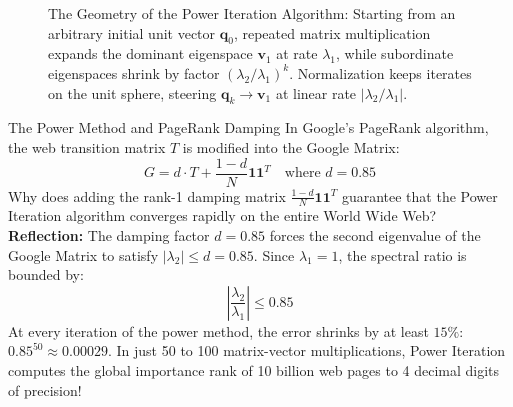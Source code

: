 \begin{figure}[htbp]
\begin{tikzpicture}
\end{tikzpicture}
\caption{The Geometry of the Power Iteration Algorithm: Starting from an arbitrary initial unit vector $\mathbf{q}_0$, repeated matrix multiplication expands the dominant eigenspace $\mathbf{v}_1$ at rate $\lambda_1$, while subordinate eigenspaces shrink by factor $(\lambda_2/\lambda_1)^k$. Normalization keeps iterates on the unit sphere, steering $\mathbf{q}_k \to \mathbf{v}_1$ at linear rate $|\lambda_2/\lambda_1|$.}
\label{fig:power_iteration_geometry}
\end{figure}

\begin{ponderbox}{The Power Method and PageRank Damping}
In Google's PageRank algorithm, the web transition matrix $T$ is modified into the Google Matrix:
\begin{equation*}
G = d \cdot T + \frac{1 - d}{N} \mathbf{1}\mathbf{1}^T \quad \text{where } d = 0.85
\end{equation*}
Why does adding the rank-1 damping matrix $\frac{1-d}{N}\mathbf{1}\mathbf{1}^T$ guarantee that the Power Iteration algorithm converges rapidly on the entire World Wide Web?
\tcblower
\textbf{Reflection:}
The damping factor $d = 0.85$ forces the second eigenvalue of the Google Matrix to satisfy $|\lambda_2| \le d = 0.85$.
Since $\lambda_1 = 1$, the spectral ratio is bounded by:
\begin{equation*}
\left|\frac{\lambda_2}{\lambda_1}\right| \le 0.85
\end{equation*}
At every iteration of the power method, the error shrinks by at least $15\%$: $0.85^{50} \approx 0.00029$.
In just 50 to 100 matrix-vector multiplications, Power Iteration computes the global importance rank of 10 billion web pages to 4 decimal digits of precision!
\end{ponderbox}

